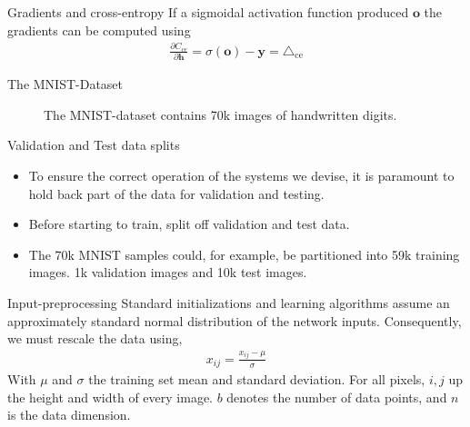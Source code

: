 \documentclass{beamer}
\begin{document}
    \begin{frame}{Gradients and cross-entropy}
      If a sigmoidal activation function produced $\mathbf{o}$ the gradients can be computed using ~\cite{nielsen2015neural,bishop2006pattern}
      \begin{align} 
         \frac{\partial C_{ce}}{\partial \mathbf{h}} 
         = \sigma(\mathbf{o}) - \mathbf{y} = \triangle_{\text{ce}}
      \end{align}
    \end{frame}

    \begin{frame}{The MNIST-Dataset}
      \begin{figure}
        
        \caption{The MNIST-dataset contains 70k images of handwritten digits.}
      \end{figure}
    \end{frame}

    \begin{frame}{Validation and Test data splits}
      \begin{itemize}
        \item To ensure the correct operation of the systems we devise, it is paramount to 
        hold back part of the data for validation and testing.
        \item Before starting to train, split off validation and test data.
        \item The 70k MNIST samples could, for example, be partitioned into 59k training images.
        1k validation images and 10k test images. 
      \end{itemize}
    \end{frame}

    \begin{frame}{Input-preprocessing}
      Standard initializations and learning algorithms assume an approximately standard normal distribution
      of the network inputs. Consequently, we must rescale the data using,
      \begin{align}
        {x}_{ij} = \frac{x_{ij} - \mu}{\sigma}
      \end{align}
      With $\mu$ and $\sigma$ the training set mean and standard deviation.
      For all pixels, $i,j$ up the height and width of every image.
      $b$ denotes the number of data points, and $n$ is the data dimension.
    \end{frame}
\end{document}
